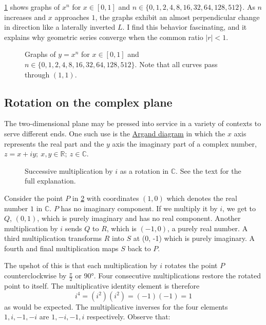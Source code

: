 \documentclass[
  a4paper,
]{article}
\begin{document}
\cref{fig:x-to-n} shows graphs of \(x^n\) for \(x \in [0, 1]\) and
\(n \in\{0, 1, 2, 4, 8, 16, 32, 64, 128, 512\}\). As \(n\) increases and
\(x\) approaches \(1\), the graphs exhibit an almost perpendicular
change in direction like a laterally inverted \(L\). I find this
behavior fascinating, and it explains why geometric series converge when
the common ratio \(\lvert r \rvert < 1\).

\begin{figure}
\hypertarget{fig:x-to-n}{%
\centering

\caption{Graphs of \(y = x^n\) for \(x \in [0, 1]\) and
\(n \in \{0, 1, 2, 4, 8, 16, 32, 64, 128, 512\}\). Note that all curves
pass through \((1, 1)\).}\label{fig:x-to-n}
}
\end{figure}

\hypertarget{rotation-on-the-complex-plane}{%
\subsection{Rotation on the complex
plane}\label{rotation-on-the-complex-plane}}

The two-dimensional plane may be pressed into service in a variety of
contexts to serve different ends. One such use is the
\href{https://mathworld.wolfram.com/ArgandDiagram.html}{Argand diagram}
in which the \(x\) axis represents the real part and the \(y\) axis the
imaginary part of a complex number,
\(z = x + iy;\:x, y \in \mathbb{R};\: z \in \mathbb{C}\).

\begin{figure}
\hypertarget{fig:C4}{%
\centering

\caption{Successive multiplication by \(i\) as a rotation in
\(\mathbb{C}\). See the text for the full explanation.}\label{fig:C4}
}
\end{figure}

Consider the point \(P\) in \cref{fig:C4} with coordinates \((1, 0)\)
which denotes the real number \(1\) in \(\mathbb{C}\). \(P\) has no
imaginary component. If we multiply it by \(i\), we get to \(Q\),
\((0, 1)\), which is purely imaginary and has no real component. Another
multiplication by \(i\) sends \(Q\) to \(R\), which is \((-1, 0)\), a
purely real number. A third multiplication transforms \(R\) into \(S\)
at (0, -1) which is purely imaginary. A fourth and final multiplication
maps \(S\) back to \(P\).

The upshot of this is that each multiplication by \(i\) rotates the
point \(P\) counterclockwise by \(\frac{\pi}{2}\) or 90°. Four
consecutive multiplications restore the rotated point to itself. The
multiplicative identity element is therefore \[
i^4 = (i^2)(i^2) = (-1)(-1) = 1
\] as would be expected. The multiplicative inverses for the four
elements \(1, i, -1, -i\) are \(1, -i, -1, i\) respectively. Observe
that:
\end{document}
